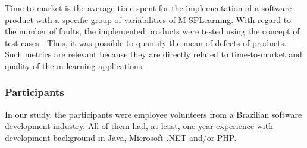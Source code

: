 \begin{table}
%
\end{table}

Time-to-market is the average time spent for the implementation of a software product with a specific group of variabilities of M-SPLearning. With regard to the number of faults, the implemented products were tested using the concept of test cases \cite{craig02}. Thus, it was possible to quantify the mean of defects of products. Such metrics are relevant because they are directly related to time-to-market and quality of the m-learning applications.

\subsubsection{Participants}

In our study, the participants were employee volunteers from a Brazilian software development industry. All of them had, at least, one year experience with development background in Java, Microsoft .NET and/or PHP.

